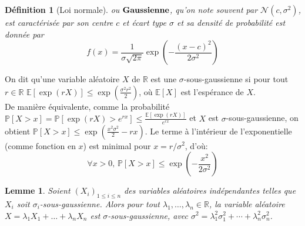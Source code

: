 \documentclass[11pt, headsepline, a4paper, fleqn, oneside]{article}
\newtheorem{lem}{Lemme}
\newtheorem{defi}{Définition}
\newtheorem{demo}{Preuve}
\newcommand{\R}{\mathbb{R}}
\begin{document}
\begin{defi}[Loi normale] ou $\bold{Gaussienne}$, qu'on note souvent par $\mathcal{N}(c,\sigma^2)$, est caractérisée par son centre $c$ et écart type $\sigma$ et sa densité de probabilité est donnée par 
\begin{equation}
    f(x)=\frac{1}{\sigma \sqrt{2 \pi}} \exp(-\frac{(x-c)^{2}}{2 \sigma^{2}})
\end{equation}
\end{defi}
On dit qu'une variable aléatoire $X$ de $\R$ est une $\sigma$-sous-gaussienne si pour tout $r\in \R$ $
\mathbb{E}[\exp (r X)] \leq \exp \left(\frac{\sigma^{2} r^{2}}{2}\right)
$, où $\mathbb{E}[X]$ est l'espérance de $X$.\\
De manière équivalente, comme la probabilité $\mathbb{P}[X>x]=\mathbb{P}\left[\exp (r X)>e^{r x}\right] \leq \frac{\mathbb{E}[\exp (r X)]}{e^{r x}}$ et $X$ est $\sigma$-sous-gaussienne, on obtient $\mathbb{P}[X>x] \leq \exp \left(\frac{x^{2} \sigma^{2}}{2}-r x\right)$. Le terme à l'intérieur de l'exponentielle (comme fonction en $x$) est minimal pour $x=r / \sigma^{2}$, d'où:
\begin{equation}
    \forall x>0,\,
\mathbb{P}[X>x] \leq \exp \left(-\frac{x^{2}}{2 \sigma^{2}}\right)
\end{equation}

\begin{lem}\label{lem1}
Soient $(X_i)_{1\leq i\leq n}$ des variables aléatoires indépendantes telles que $X_i$ soit $\sigma_i$-sous-gaussienne. Alors pour tout $\lambda_1,\dots,\lambda_n \in \R$, la variable aléatoire $X=\lambda_1 X_1 +\dots+\lambda_n X_n$ est $\sigma$-sous-gaussienne, avec $\sigma^{2}=\lambda_{1}^{2} \sigma_{1}^{2}+\cdots+\lambda_{n}^{2} \sigma_{n}^{2}$.
\end{lem}

\end{document}
